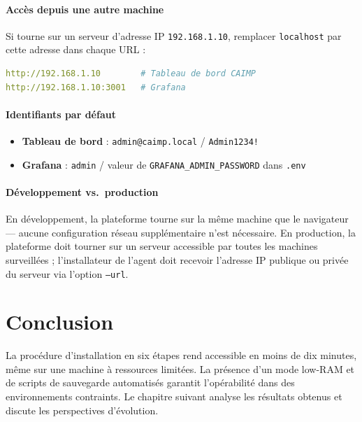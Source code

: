 \paragraph{Accès depuis une autre machine}
Si \caimp{} tourne sur un serveur d'adresse IP \texttt{192.168.1.10}, remplacer
\texttt{localhost} par cette adresse dans chaque URL :
\begin{lstlisting}[language=YAML]
http://192.168.1.10        # Tableau de bord CAIMP
http://192.168.1.10:3001   # Grafana
\end{lstlisting}

\paragraph{Identifiants par défaut}
\begin{itemize}
  \item \textbf{Tableau de bord \caimp{}} : \texttt{admin@caimp.local} /
    \texttt{Admin1234!}
  \item \textbf{Grafana} : \texttt{admin} / valeur de
    \texttt{GRAFANA\_ADMIN\_PASSWORD} dans \texttt{.env}
\end{itemize}

\paragraph{Développement vs.\ production}
En développement, la plateforme tourne sur la même machine que le navigateur —
aucune configuration réseau supplémentaire n'est nécessaire. En production, la
plateforme doit tourner sur un serveur accessible par toutes les machines
surveillées ; l'installateur de l'agent doit recevoir l'adresse IP publique ou
privée du serveur via l'option \texttt{--url}.

\section*{Conclusion}

La procédure d'installation en six étapes rend \caimp{} accessible en moins
de dix minutes, même sur une machine à ressources limitées. La présence d'un
mode low-RAM et de scripts de sauvegarde automatisés garantit l'opérabilité
dans des environnements contraints. Le chapitre suivant analyse les résultats
obtenus et discute les perspectives d'évolution.

